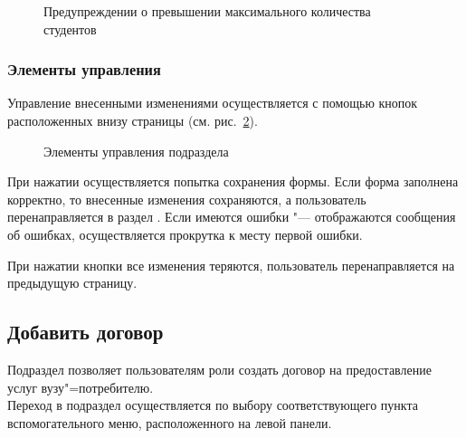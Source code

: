 		\begin{figure}[H]
		\caption{Предупреждении о превышении максимального количества студентов}
		\label{agreement:edit_course_warn_cancel}
		\end{figure}

 	
\subsubsection{Элементы управления}
Управление внесенными изменениями осуществляется с помощью кнопок расположенных внизу страницы (см. рис.~\ref{agreement:edit_buttons}).
		\begin{figure}[H]
		\caption{Элементы управления подраздела }
		\label{agreement:edit_buttons}
		\end{figure}	
		
При нажатии  осуществляется попытка сохранения формы. 
Если форма заполнена корректно, то внесенные изменения сохраняются, а пользователь перенаправляется в раздел .
Если имеются ошибки "--- отображаются сообщения об ошибках, осуществляется прокрутка к месту первой ошибки. 

При нажатии кнопки  все изменения теряются, пользователь перенаправляется на предыдущую страницу.


\subsection{Добавить договор}
Подраздел позволяет пользователям роли  создать договор на предоставление услуг вузу"=потребителю.\\

Переход в подраздел осуществляется по выбору соответствующего пункта вспомогательного меню, расположенного на левой панели.\\

